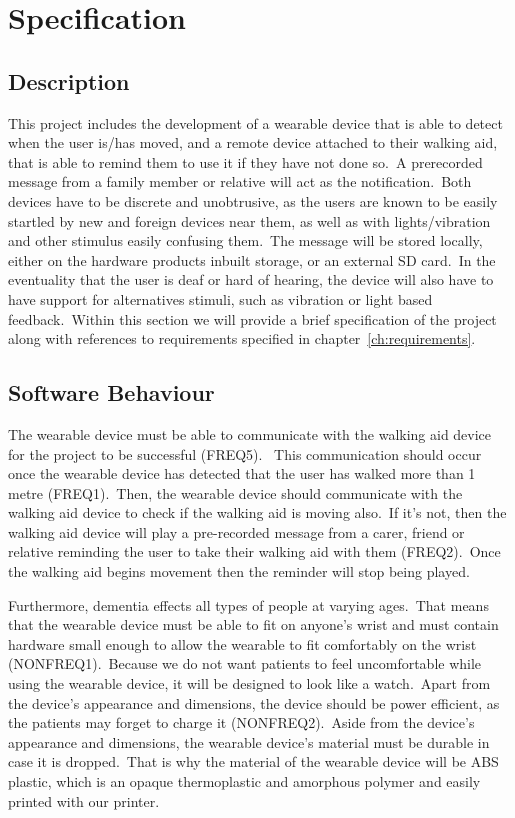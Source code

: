 \chapter{Specification}\label{ch:specification}
    \section{Description}

        This project includes the development of a wearable device that is able to detect when the user is/has moved,
        and a remote device attached to their walking aid, that is able to remind them to use it if they have not done
        so.\ A prerecorded message from a family member or relative will act as the notification.\ Both devices have to
        be discrete and unobtrusive, as the users are known to be easily startled by new and foreign devices near them,
        as well as with lights/vibration and other stimulus easily confusing them.\ The message will be stored locally,
        either on the hardware products inbuilt storage, or an external SD card.\ In the eventuality that the user is
        deaf or hard of hearing, the device will also have to have support for alternatives stimuli, such as vibration
        or light based feedback.\ Within this section we will provide a brief specification of the project along with
        references to requirements specified in chapter~\ref{ch:requirements}.

    \section{Software Behaviour}
        The wearable device must be able to communicate with the walking aid device for the project to be successful
        (FREQ5). \ This communication should occur once the wearable device has detected that the user has walked more
        than 1 metre (FREQ1).\ Then, the wearable device should communicate with the walking aid device to check if the
        walking aid is moving also.\ If it's not, then the walking aid device will play a pre-recorded message from a
        carer, friend or relative reminding the user to take their walking aid with them (FREQ2).\ Once the walking aid
        begins movement then the reminder will stop being played.

        Furthermore, dementia effects all types of people at varying ages.\ That means that the wearable device must be
        able to fit on anyone's wrist and must contain hardware small enough to allow the wearable to fit comfortably on
        the wrist (NONFREQ1).\ Because we do not want patients to feel uncomfortable while using the wearable device, it
        will be designed to look like a watch.\ Apart from the device's appearance and dimensions, the device should be
        power efficient, as the patients may forget to charge it (NONFREQ2).\ Aside from the device's appearance and
        dimensions, the wearable device's material must be durable in  case it is dropped.\ That is why the material of
        the wearable device will be ABS plastic, which is an opaque thermoplastic and amorphous polymer and easily printed
        with our printer.

